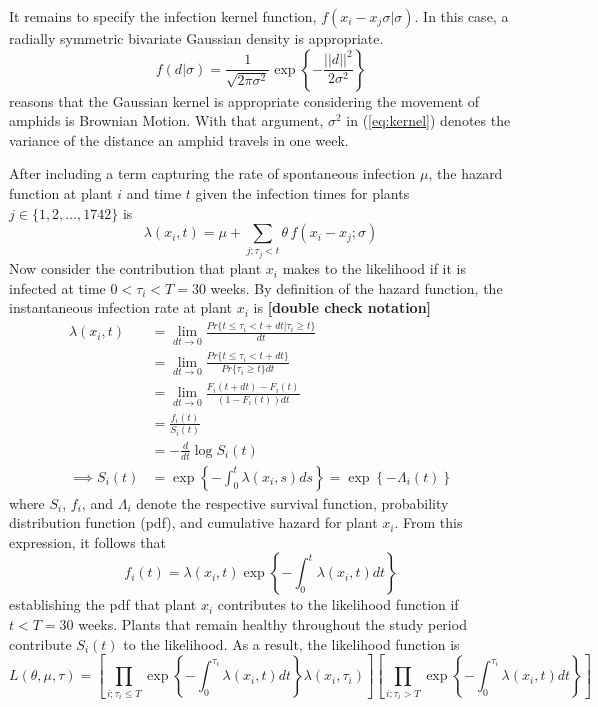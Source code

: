 \documentclass{uwstat572}
\begin{document}
It remains to specify the infection kernel function, $f(x_i -x_j \sigma | \sigma)$. In this case, a radially symmetric bivariate Gaussian density is appropriate. 
\begin{equation} f(d|\sigma) = \frac{1}{\sqrt{2\pi \sigma^2}} \exp \left\{-\frac{||d||^2}{2\sigma^2} \right\} \label{eq:kernel} \end{equation}
\cite{Brown} reasons that the Gaussian kernel is appropriate considering the movement of amphids is Brownian Motion. 
With that argument, $\sigma^2$ in (\ref{eq:kernel}) denotes the variance of the distance an amphid travels in one week. 

After including a term capturing the rate of spontaneous infection $\mu$, the hazard function at plant $i$ and time $t$ given the infection times for plants $j \in \{1, 2, \dots, 1742\}$ is 
$$\lambda(x_i,t) = \mu + \sum_{j; \tau_j<t} \theta \, f(x_i - x_j; \sigma)$$
Now consider the contribution that plant $x_i$ makes to the likelihood if it is infected at time $0<\tau_i<T=30$ weeks. 
By definition of the hazard function, the instantaneous infection rate at plant $x_i$ is \textbf{[double check notation]}
\begin{align*}
\lambda(x_i, t) &= \lim_{dt \to 0} \frac{Pr\{ t \le \tau_i < t+dt | \tau_i \ge t \}}{dt} \\
	&= \lim_{dt \to 0} \frac{Pr\{ t \le \tau_i < t+dt\}}{Pr\{\tau_i\ge t\}dt}\\
	&= \lim_{dt \to 0} \frac{F_i(t+dt) - F_i(t)}{(1-F_i(t))dt} \\
	&= \frac{f_i(t)}{S_i(t)}\\
	&= -\frac{d}{dt} \log S_i(t) \\
\implies S_i(t) &= \exp \left\{ - \int_0^t \lambda(x_i,s) ds  \right\} = \exp \left\{ - \Lambda_i(t)  \right\}
\end{align*}
where $S_i$, $f_i$, and $\Lambda_i$ denote the respective survival function, probability distribution function (pdf), and cumulative hazard for plant $x_i$. 
From this expression, it follows that
$$ f_i(t) = \lambda(x_i,t) \exp \left\{ - \int_0^t \lambda(x_i,t) dt  \right\}$$
establishing the pdf that plant $x_i$ contributes to the likelihood function if $t<T=30$ weeks. 
Plants that remain healthy throughout the study period contribute $S_i(t)$ to the likelihood. 
As a result, the likelihood function is
\begin{equation} 
L(\theta, \mu, \tau) = \left[ \prod_{i;\tau_i \le T} \exp \left\{-\int^{\tau_i}_0 \lambda(x_i, t)dt\right \} \lambda(x_i, \tau_i)\right] \left[ \prod_{i;\tau_i > T} \exp \left\{-\int^{\tau_i}_0 \lambda(x_i, t)dt \right\}\right] 
\end{equation}
\end{document}
